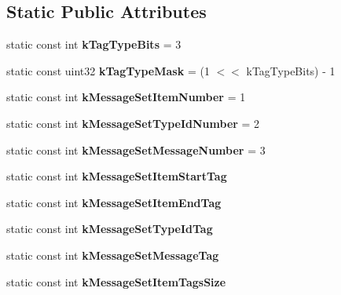 \subsection*{Static Public Attributes}
\begin{DoxyCompactItemize}
\item 
\mbox{\label{classgoogle_1_1protobuf_1_1internal_1_1WireFormatLite_ae595c287c1554c7c4ce575787aab2483}} 
static const int {\bfseries k\+Tag\+Type\+Bits} = 3
\item 
\mbox{\label{classgoogle_1_1protobuf_1_1internal_1_1WireFormatLite_a7c55949efebf93a2f822fde9cc98169d}} 
static const uint32 {\bfseries k\+Tag\+Type\+Mask} = (1 $<$$<$ k\+Tag\+Type\+Bits) -\/ 1
\item 
\mbox{\label{classgoogle_1_1protobuf_1_1internal_1_1WireFormatLite_a55645ee6caac01b2c90cef915ea2c455}} 
static const int {\bfseries k\+Message\+Set\+Item\+Number} = 1
\item 
\mbox{\label{classgoogle_1_1protobuf_1_1internal_1_1WireFormatLite_a4662c3d53a36ca644504b2a7a71bcc0c}} 
static const int {\bfseries k\+Message\+Set\+Type\+Id\+Number} = 2
\item 
\mbox{\label{classgoogle_1_1protobuf_1_1internal_1_1WireFormatLite_ab4e3609b6809d7796b4262e1a9b18ad0}} 
static const int {\bfseries k\+Message\+Set\+Message\+Number} = 3
\item 
static const int {\bfseries k\+Message\+Set\+Item\+Start\+Tag}
\item 
static const int {\bfseries k\+Message\+Set\+Item\+End\+Tag}
\item 
static const int {\bfseries k\+Message\+Set\+Type\+Id\+Tag}
\item 
static const int {\bfseries k\+Message\+Set\+Message\+Tag}
\item 
static const int {\bfseries k\+Message\+Set\+Item\+Tags\+Size}
\item 
\mbox{\label{classgoogle_1_1protobuf_1_1internal_1_1WireFormatLite_a16666f7cf5cb21dd84e8c2e01077b63a}} 
$$
\end{DoxyCompactItemize}
